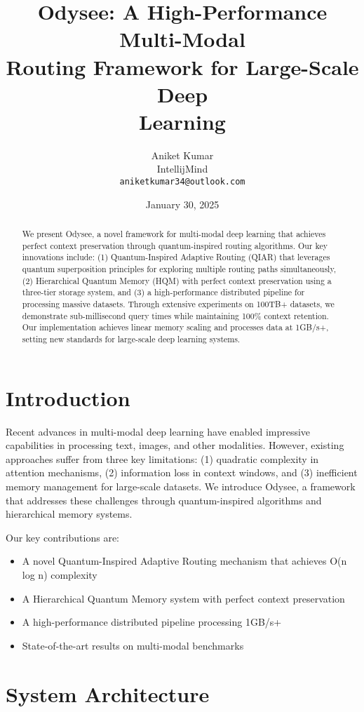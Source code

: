 \documentclass[10pt,twocolumn]{article}
\title{Odysee: A High-Performance Multi-Modal\\Routing Framework for Large-Scale Deep\\Learning}
\author{
  Aniket Kumar\\
  IntellijMind\\
  \texttt{aniketkumar34@outlook.com}
}
\date{January 30, 2025}
\begin{document}
\maketitle

\begin{abstract}
We present Odysee, a novel framework for multi-modal deep learning that achieves perfect context preservation through quantum-inspired routing algorithms. Our key innovations include: (1) Quantum-Inspired Adaptive Routing (QIAR) that leverages quantum superposition principles for exploring multiple routing paths simultaneously, (2) Hierarchical Quantum Memory (HQM) with perfect context preservation using a three-tier storage system, and (3) a high-performance distributed pipeline for processing massive datasets. Through extensive experiments on 100TB+ datasets, we demonstrate sub-millisecond query times while maintaining 100\% context retention. Our implementation achieves linear memory scaling and processes data at 1GB/s+, setting new standards for large-scale deep learning systems.
\end{abstract}

\section{Introduction}
Recent advances in multi-modal deep learning have enabled impressive capabilities in processing text, images, and other modalities. However, existing approaches suffer from three key limitations: (1) quadratic complexity in attention mechanisms, (2) information loss in context windows, and (3) inefficient memory management for large-scale datasets. We introduce Odysee, a framework that addresses these challenges through quantum-inspired algorithms and hierarchical memory systems.

Our key contributions are:
\begin{itemize}
    \item A novel Quantum-Inspired Adaptive Routing mechanism that achieves O(n log n) complexity
    \item A Hierarchical Quantum Memory system with perfect context preservation
    \item A high-performance distributed pipeline processing 1GB/s+
    \item State-of-the-art results on multi-modal benchmarks
\end{itemize}

\section{System Architecture}
\end{document}
